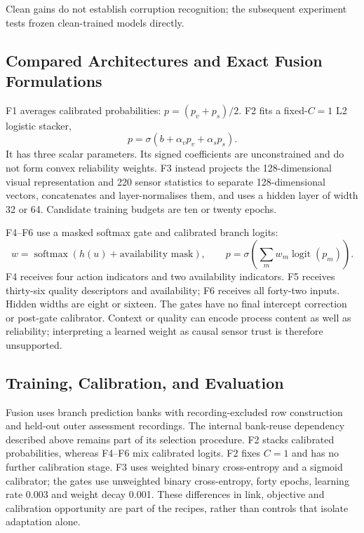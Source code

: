 Clean gains do not establish corruption recognition; the subsequent experiment tests
frozen clean-trained models directly.

\subsection{Compared Architectures and Exact Fusion Formulations}
F1 averages calibrated probabilities: $p=(p_v+p_s)/2$. F2 fits a fixed-$C=1$ L2 logistic stacker,
\begin{equation}p=\sigma(b+\alpha_v p_v+\alpha_s p_s).\end{equation}
It has three scalar parameters. Its signed coefficients are unconstrained and do not
form convex reliability weights. F3 instead projects the 128-dimensional visual
representation and 220 sensor statistics to separate 128-dimensional vectors,
concatenates and layer-normalises them, and uses a hidden layer of width 32 or 64.
Candidate training budgets are ten or twenty epochs.

F4--F6 use a masked softmax gate and calibrated branch logits:
\begin{equation}w=\operatorname{softmax}(h(u)+\text{availability mask}),\qquad
p=\sigma\!\left(\sum_m w_m\operatorname{logit}(p_m)\right).\end{equation}
F4 receives four action indicators and two availability indicators. F5 receives
thirty-six quality descriptors and availability; F6 receives all forty-two inputs.
Hidden widths are eight or sixteen. The gates have no final intercept correction or
post-gate calibrator. Context or quality can encode process content as well as
reliability; interpreting a learned weight as causal sensor trust is therefore
unsupported.

\subsection{Training, Calibration, and Evaluation}
Fusion uses branch prediction banks with recording-excluded row construction and
held-out outer assessment recordings. The internal bank-reuse dependency described above
remains part of its selection procedure. F2 stacks calibrated probabilities, whereas
F4--F6 mix calibrated logits. F2 fixes $C=1$ and has no further calibration stage. F3
uses weighted binary cross-entropy and a sigmoid calibrator; the gates use unweighted
binary cross-entropy, forty epochs, learning rate 0.003 and weight decay 0.001. These
differences in link, objective and calibration opportunity are part of the recipes,
rather than controls that isolate adaptation alone.

